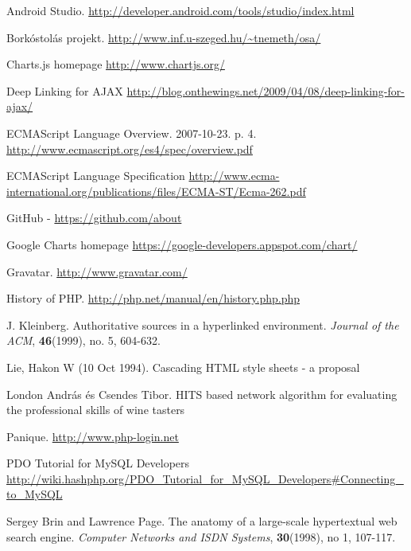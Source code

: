 \documentclass[12pt]{report}
\theoremstyle{definition}
\begin{document}
	\begin{thebibliography}{99}
		
		Android Studio.
		\url{http://developer.android.com/tools/studio/index.html}
		
		Borkóstolás projekt.  \url{http://www.inf.u-szeged.hu/~tnemeth/osa/}
		
		Charts.js homepage
		\url{http://www.chartjs.org/}
		
		Deep Linking for AJAX
		\url{http://blog.onthewings.net/2009/04/08/deep-linking-for-ajax/}
		
		ECMAScript Language Overview. 2007-10-23. p. 4. \url{http://www.ecmascript.org/es4/spec/overview.pdf}
		
		ECMAScript Language Specification \url{http://www.ecma-international.org/publications/files/ECMA-ST/Ecma-262.pdf}
	
		GitHub - \url{https://github.com/about}
	
		Google Charts homepage
		\url{https://google-developers.appspot.com/chart/}
		
		Gravatar.
		\url{http://www.gravatar.com/}	
	
		History of PHP. \url{http://php.net/manual/en/history.php.php}
				
		J. Kleinberg. Authoritative sources in a hyperlinked environment.
		\emph{Journal of the ACM}, \textbf{46}(1999), no. 5, 604-632.
		
		Lie, Hakon W (10 Oct 1994). Cascading HTML style sheets - a proposal
	
		London András és Csendes Tibor. 
		HITS based network algorithm for evaluating the professional skills of wine tasters

		Panique. \url{http://www.php-login.net}
		
		PDO Tutorial for MySQL Developers
		\url{http://wiki.hashphp.org/PDO\_Tutorial\_for\_MySQL\_Developers\#Connecting\_to\_MySQL}
		
		Sergey Brin and Lawrence Page. 
		The anatomy of a large-scale hypertextual web search engine. 
		\emph{ Computer Networks and ISDN Systems},
		\textbf{30}(1998), no 1, 107-117.		
		

\end{thebibliography}
\end{document}
